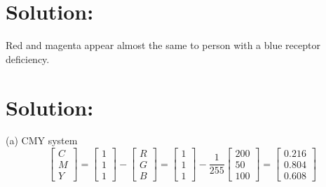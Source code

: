 \documentclass[12pt]{article}
\begin{document}
\section{Solution:}
Red and magenta appear almost the same to person with a blue receptor deficiency.
\section{Solution:}
(a) CMY system\\
\begin{equation*}
{\left[ \begin{array}{c}
C\\
M\\
Y
\end{array} 
\right]} = {\left[ \begin{array}{c}
1\\
1\\
1
\end{array} 
\right]} - 
{\left[ \begin{array}{c}
R\\
G\\
B
\end{array} 
\right]} = 
{\left[ \begin{array}{c}
1\\
1\\
1
\end{array} 
\right]} - \frac{1}{255}
{\left[ \begin{array}{c}
200\\
50\\
100
\end{array} 
\right]} 
={\left[ \begin{array}{c}
0.216\\
0.804\\
0.608
\end{array} 
\right]}
\end{equation*}
\end{document}
